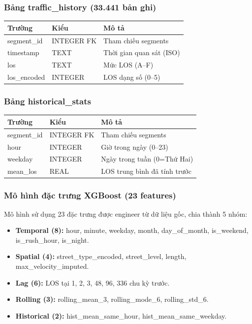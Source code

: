 \documentclass[12pt,a4paper]{article}
\begin{document}
\subsubsection{Bảng traffic\_history (33.441 bản ghi)}
\begin{table}[H]
\centering
\begin{tabularx}{0.7\textwidth}{L{3cm}L{2.5cm}Y}
\toprule
\textbf{Trường} & \textbf{Kiểu} & \textbf{Mô tả} \\
\midrule
segment\_id & INTEGER FK & Tham chiếu segments \\
timestamp & TEXT & Thời gian quan sát (ISO) \\
los & TEXT & Mức LOS (A--F) \\
los\_encoded & INTEGER & LOS dạng số (0--5) \\
\bottomrule
\end{tabularx}
\end{table}

\subsubsection{Bảng historical\_stats}
\begin{table}[H]
\centering
\begin{tabularx}{0.8\textwidth}{L{3.2cm}L{2.5cm}Y}
\toprule
\textbf{Trường} & \textbf{Kiểu} & \textbf{Mô tả} \\
\midrule
segment\_id & INTEGER FK & Tham chiếu segments \\
hour & INTEGER & Giờ trong ngày (0--23) \\
weekday & INTEGER & Ngày trong tuần (0=Thứ Hai) \\
mean\_los & REAL & LOS trung bình đã tính trước \\
\bottomrule
\end{tabularx}
\end{table}

\subsubsection{Mô hình đặc trưng XGBoost (23 features)}
Mô hình sử dụng 23 đặc trưng được engineer từ dữ liệu gốc, chia thành 5 nhóm:
\begin{itemize}[leftmargin=1.2cm]
    \item \textbf{Temporal (8):} hour, minute, weekday, month, day\_of\_month, is\_weekend, is\_rush\_hour, is\_night.
    \item \textbf{Spatial (4):} street\_type\_encoded, street\_level, length, max\_velocity\_imputed.
    \item \textbf{Lag (6):} LOS tại 1, 2, 3, 48, 96, 336 chu kỳ trước.
    \item \textbf{Rolling (3):} rolling\_mean\_3, rolling\_mode\_6, rolling\_std\_6.
    \item \textbf{Historical (2):} hist\_mean\_same\_hour, hist\_mean\_same\_weekday.
\end{itemize}
\end{document}
